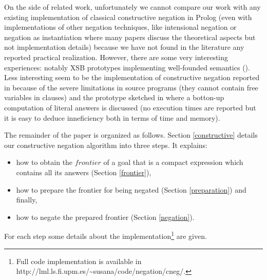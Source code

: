 \documentclass{tlp}
\begin{document}
On the side of related work, unfortunately we cannot compare our work
with any existing implementation of classical constructive negation in
Prolog (even with implementations of other negation techniques, like
intensional negation \cite{Barbuti1,Bruscoli,SusanaFLOPS04} or negation
as instantiation \cite{DiPierro} where many papers discuss the
theoretical aspects but not implementation details) because we have
not found in the literature any reported practical
realization. However, there are some very interesting experiences:
notably XSB prototypes implementing well-founded semantics
(\cite{Alferes95}). Less interesting seem to be the implementation of
constructive negation reported in \cite{Bartak} because of the severe
limitations in source programs (they cannot contain free variables in
clauses) and the prototype sketched in \cite{BNC-cneg} where a
botton-up computation of literal answers is discussed (no execution
times are reported but it is easy to deduce inneficiency both in terms
of time and memory).



The remainder of the paper is organized as follows. Section \ref{constructive}
details our constructive negation algorithm into three steps. It explains:
\begin{itemize} 
      \item how to obtain the $frontier$ of a goal that is a compact
expression which contains all its answers (Section \ref{frontier}),
      \item how to prepare the frontier for being negated (Section
\ref{preparation}) and finally,
      \item how to negate the prepared frontier (Section \ref{negation}).
\end{itemize} 
For each step some details about the implementation\footnote{Full code
  implementation is available in 
  http://lml.ls.fi.upm.es/\~{}susana/code/negation/cneg/.} are given.   
\end{document}
